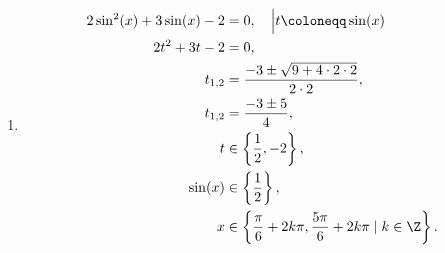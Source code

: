 \documentclass[11pt,a4paper]{article}
\begin{document}
        \begin{enumerate}
            
            \item \begin{align*}
                2\sin^2(x) + 3\sin(x) - 2 &= 0, \quad \Big| t \coloneqq \sin(x)
            \\
                2t^2 + 3t - 2 &= 0,
            \\
                t_{1,2} &= \frac{-3 \pm \sqrt{9+4\cdot 2\cdot 2}}{2\cdot 2},
            \\
                t_{1,2} &= \frac{-3\pm 5}{4},
            \\
                t &\in \left\{ \frac 12, -2 \right\},
            \\
                \sin(x) &\in \left\{ \frac 12 \right\},
            \\
                x &\in \left\{ \frac \pi 6 + 2k\pi, \frac{5\pi}{6} + 2k\pi \mid k \in \Z \right\}.
            \end{align*}


\end{enumerate}
\end{document}

